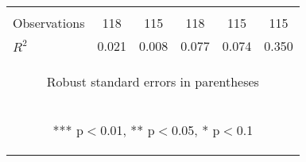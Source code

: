 \begin{center}
\begin{tabular}{lccccc}
\vspace{4pt} & \begin{footnotesize}\end{footnotesize} & \begin{footnotesize}\end{footnotesize} & \begin{footnotesize}\end{footnotesize} & \begin{footnotesize}\end{footnotesize} & \begin{footnotesize}\end{footnotesize} \\
Observations & 118 & 115 & 118 & 115 & 115 \\
 $R^2$ & 0.021 & 0.008 & 0.077 & 0.074 & 0.350 \\ \hline
\multicolumn{6}{c}{\begin{footnotesize} Robust standard errors in parentheses\end{footnotesize}} \\
\multicolumn{6}{c}{\begin{footnotesize} *** p$<$0.01, ** p$<$0.05, * p$<$0.1\end{footnotesize}} \\
\end{tabular}
\end{center}
